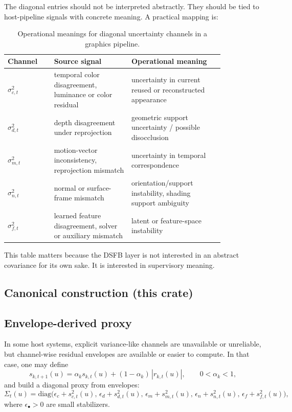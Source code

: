 \documentclass[11pt]{article}
\theoremstyle{definition}
\theoremstyle{plain}
\begin{document}
The diagonal entries should not be interpreted abstractly. They should be tied to host-pipeline signals with concrete meaning. A practical mapping is:

\begin{table}[H]
\centering
\caption{Operational meanings for diagonal uncertainty channels in a graphics pipeline.}
\begin{tabular}{>{\raggedright\arraybackslash}p{0.18\linewidth} >{\raggedright\arraybackslash}p{0.30\linewidth} >{\raggedright\arraybackslash}p{0.36\linewidth}}
\toprule
Channel & Source signal & Operational meaning \\
\midrule
$\sigma^{2}_{c,t}$ & temporal color disagreement, luminance or color residual & uncertainty in current reused or reconstructed appearance \\
$\sigma^{2}_{d,t}$ & depth disagreement under reprojection & geometric support uncertainty / possible disocclusion \\
$\sigma^{2}_{m,t}$ & motion-vector inconsistency, reprojection mismatch & uncertainty in temporal correspondence \\
$\sigma^{2}_{n,t}$ & normal or surface-frame mismatch & orientation/support instability, shading support ambiguity \\
$\sigma^{2}_{f,t}$ & learned feature disagreement, solver or auxiliary mismatch & latent or feature-space instability \\
\bottomrule
\end{tabular}
\end{table}

This table matters because the DSFB layer is not interested in an abstract covariance for its own sake. It is interested in supervisory meaning.


\subsection*{Canonical construction (this crate)}


\subsection{Envelope-derived proxy}

In some host systems, explicit variance-like channels are unavailable or unreliable, but channel-wise residual envelopes are available or easier to compute. In that case, one may define
\begin{equation}
s_{k,t+1}(u)=\alpha_k s_{k,t}(u)+(1-\alpha_k)\,|r_{k,t}(u)|,
\qquad 0<\alpha_k<1,
\end{equation}
and build a diagonal proxy from envelopes:
\begin{equation}
\Sigma_t(u)=\mathrm{diag}\!\bigl(
\epsilon_c + s^{2}_{c,t}(u),\,
\epsilon_d + s^{2}_{d,t}(u),\,
\epsilon_m + s^{2}_{m,t}(u),\,
\epsilon_n + s^{2}_{n,t}(u),\,
\epsilon_f + s^{2}_{f,t}(u)
\bigr),
\end{equation}
where $\epsilon_\bullet>0$ are small stabilizers.
\end{document}
